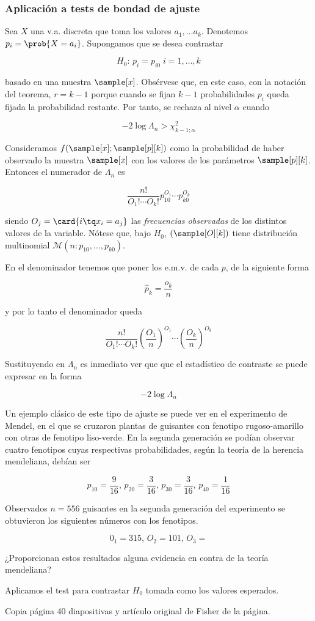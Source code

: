\documentclass{apuntes}
\begin{document}
\subsubsection{Aplicación a tests de bondad de ajuste} Sea $X$ una v.a. discreta que toma los valores $a_1,\dotsc a_k$. Denotemos $p_i = \prob{X=a_i}$. Supongamos que se desea contrastar

\[ H_0:\, p_i=p_{i0}\; i=1,\dots,k \]

basado en una muestra $\sample[x]$. Obsérvese que, en este caso, con la notación del teorema, $r=k-1$ porque cuando se fijan $k-1$ probabilidades $p_i$ queda fijada la probabilidad restante. Por tanto, se rechaza al nivel $α$ cuando

\[ - 2 \log Λ_n > χ_{k-1;α}^2 \]

Consideramos $f(\sample[x];\sample[p][k])$ como la probabilidad de haber observado la muestra $\sample[x]$ con los valores de los parámetros $\sample[p][k]$. Entonces el numerador de $Λ_n$ es 

\[ \frac{n!}{O_1!\dotsb O_k!}p_{10}^{O_1}\dotsb p_{k0}^{O_k} \]

siendo $ O_j=\card{i\tq x_i = a_j}$ las \textit{frecuencias observadas} de los distintos valores de la variable. Nótese que, bajo $H_0$, $(\sample[O][k])$ tiene distribución multinomial $\mathcal{M}(n:p_{10},\dotsc , p_{k0})$. 

En el denominador tenemos que poner los e.m.v. de cada $p$, de la siguiente forma

\[ \hat{p}_k = \frac{o_k}{n} \]

y por lo tanto el denominador queda

\[ \frac{n!}{O_1!\dotsb O_k!} \left(\frac{O_1}{n}\right)^{O_1} \dotsb \left(\frac{O_k}{n}\right)^{O_k} \]

Sustituyendo en $Λ_n$ es inmediato ver que que el estadístico de contraste se puede expresar en la forma 

\[ - 2 \log Λ_n \]


\begin{example} Un ejemplo clásico de este tipo de ajuste se puede ver en el experimento de Mendel, en el que se cruzaron plantas de guisantes con fenotipo rugoso-amarillo con otras de fenotipo liso-verde. En la segunda generación se podían observar cuatro fenotipos cuyas respectivas probabilidades, según la teoría de la herencia mendeliana, debían ser 

\[ p_{10} = \frac{9}{16},\,p_{20}=\frac{3}{16},\,p_{30}=\frac{3}{16},\,p_{40}=\frac{1}{16} \]

Observados $n=556$ guisantes en la segunda generación del experimento se obtuvieron los siguientes números con los fenotipos.


\[ 0_1=315,\,O_2=101,\,O_3= \]

¿Proporcionan estos resultados alguna evidencia en contra de la teoría mendeliana?

Aplicamos el test para contrastar $H_0$ tomada como los valores esperados. 

Copia página 40 diapositivas y artículo original de Fisher de la página.

\end{example}
\end{document}
